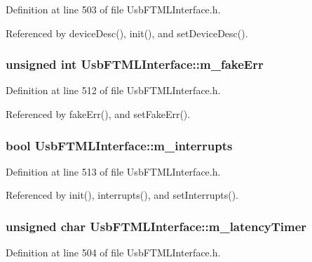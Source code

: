 Definition at line 503 of file UsbFTMLInterface.h.

Referenced by deviceDesc(), init(), and setDeviceDesc().\hypertarget{classUsbFTMLInterface_a35c84586c9aae7555b56481d636338e8}{
\subsubsection[{m\_\-fakeErr}]{\setlength{\rightskip}{0pt plus 5cm}unsigned int {\bf UsbFTMLInterface::m\_\-fakeErr}}}
\label{classUsbFTMLInterface_a35c84586c9aae7555b56481d636338e8}


Definition at line 512 of file UsbFTMLInterface.h.

Referenced by fakeErr(), and setFakeErr().\hypertarget{classUsbFTMLInterface_adb6a6a61e78d9b489e6ecefd5752d5ad}{
\subsubsection[{m\_\-interrupts}]{\setlength{\rightskip}{0pt plus 5cm}bool {\bf UsbFTMLInterface::m\_\-interrupts}}}
\label{classUsbFTMLInterface_adb6a6a61e78d9b489e6ecefd5752d5ad}


Definition at line 513 of file UsbFTMLInterface.h.

Referenced by init(), interrupts(), and setInterrupts().\hypertarget{classUsbFTMLInterface_a28342ea2c00af670f1376aaa36ad0236}{
\subsubsection[{m\_\-latencyTimer}]{\setlength{\rightskip}{0pt plus 5cm}unsigned char {\bf UsbFTMLInterface::m\_\-latencyTimer}}}
\label{classUsbFTMLInterface_a28342ea2c00af670f1376aaa36ad0236}


Definition at line 504 of file UsbFTMLInterface.h.

